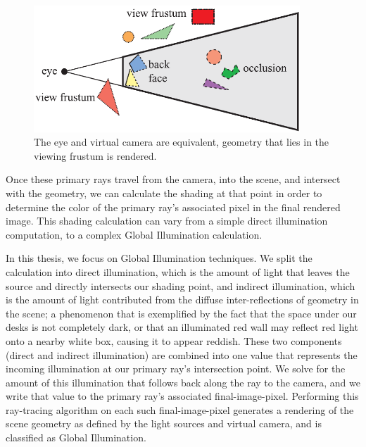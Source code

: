 \begin{figure}[h!]
    \centering
    \includegraphics[width=100mm]{../img/RTR3_14_09_camera.png}
    \caption[Virtual camera, frustum, and geometry]{The eye and virtual camera are equivalent, geometry that lies in the viewing frustum is rendered. \cite{bib:rtr}}
    \label{fig:camera}
\end{figure}

Once these primary rays travel from the camera, into the scene, and intersect with the geometry, we can calculate the shading at that point in order to determine the color of the primary ray's associated pixel in the final rendered image. This shading calculation can vary from a simple direct illumination computation, to a complex Global Illumination calculation.

In this thesis, we focus on Global Illumination techniques. We split the calculation into direct illumination, which is the amount of light that leaves the source and directly intersects our shading point, and indirect illumination, which is the amount of light contributed from the diffuse inter-reflections of geometry in the scene; a phenomenon that is exemplified by the fact that the space under our desks is not completely dark, or that an illuminated red wall may reflect red light onto a nearby white box, causing it to appear reddish. These two components (direct and indirect illumination) are combined into one value that represents the incoming illumination at our primary ray's intersection point. We solve for the amount of this illumination that follows back along the ray to the camera, and we write that value to the primary ray's associated final-image-pixel. Performing this ray-tracing algorithm on each such final-image-pixel generates a rendering of the scene geometry as defined by the light sources and virtual camera, and is classified as Global Illumination.

